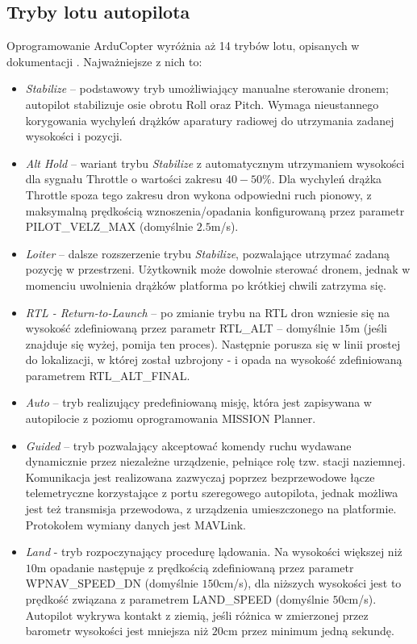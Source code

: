 \subsection{Tryby lotu autopilota}
\label{flightmodes}
Oprogramowanie ArduCopter wyróżnia aż 14 trybów lotu, opisanych w dokumentacji \cite{FlightModes}. Najważniejsze z nich to:
\begin{itemize}
	\item \textit{Stabilize} -- podstawowy tryb umożliwiający manualne sterowanie dronem; autopilot stabilizuje osie obrotu Roll oraz Pitch. Wymaga nieustannego korygowania wychyleń drążków aparatury radiowej do utrzymania zadanej wysokości i pozycji.
	\item \textit{Alt Hold} -- wariant trybu \textit{Stabilize} z automatycznym utrzymaniem wysokości dla sygnału Throttle o wartości zakresu $40-50\%$. Dla wychyleń drążka Throttle spoza tego zakresu dron wykona odpowiedni ruch pionowy, z maksymalną prędkością wznoszenia/opadania konfigurowaną przez parametr PILOT\_VELZ\_MAX (domyślnie $2.5$m/s).
	\item \textit{Loiter} -- dalsze rozszerzenie trybu \textit{Stabilize}, pozwalające utrzymać zadaną pozycję w przestrzeni. Użytkownik może dowolnie sterować dronem, jednak w momenciu uwolnienia drążków platforma po krótkiej chwili zatrzyma się.
	\item \textit{RTL - Return-to-Launch} -- po zmianie trybu na RTL dron wzniesie się na wysokość zdefiniowaną przez parametr RTL\_ALT -- domyślnie $15$m (jeśli znajduje się wyżej, pomija ten proces). Następnie porusza się w linii prostej do lokalizacji, w której został uzbrojony - i opada na wysokość zdefiniowaną parametrem RTL\_ALT\_FINAL.
	\item \textit{Auto} -- tryb realizujący predefiniowaną misję, która jest zapisywana w autopilocie z poziomu oprogramowania MISSION Planner.
	\item \textit{Guided} -- tryb pozwalający akceptować komendy ruchu  wydawane dynamicznie przez niezależne urządzenie, pełniące rolę tzw. stacji naziemnej. Komunikacja jest realizowana zazwyczaj poprzez bezprzewodowe łącze telemetryczne korzystające z portu szeregowego autopilota, jednak możliwa jest też transmisja przewodowa, z urządzenia umieszczonego na platformie. Protokołem wymiany danych jest MAVLink.
	\item \textit{Land} - tryb rozpoczynający procedurę lądowania. Na wysokości większej niż $10$m opadanie następuje z prędkością zdefiniowaną przez parametr WPNAV\_SPEED\_DN (domyślnie $150$cm/s), dla niższych wysokości jest to prędkość związana z parametrem LAND\_SPEED (domyślnie $50$cm/s). Autopilot wykrywa kontakt z ziemią, jeśli różnica w zmierzonej przez barometr wysokości jest mniejsza niż $20$cm przez minimum jedną sekundę.
\end{itemize}

